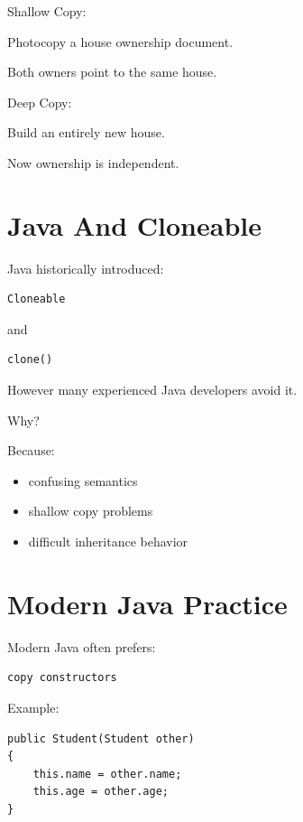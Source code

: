 \documentclass[11pt,a4paper]{book}
\begin{document}
\begin{mentalmodel}

Shallow Copy:

Photocopy a house ownership document.

Both owners point to the same house.

Deep Copy:

Build an entirely new house.

Now ownership is independent.

\end{mentalmodel}


\section{Java And Cloneable}

Java historically introduced:

\begin{verbatim}
Cloneable
\end{verbatim}

and

\begin{verbatim}
clone()
\end{verbatim}

However many experienced Java developers avoid it.

Why?

Because:

\begin{itemize}

\item confusing semantics
\item shallow copy problems
\item difficult inheritance behavior
\end{itemize}


\section{Modern Java Practice}

Modern Java often prefers:

\begin{verbatim}
copy constructors
\end{verbatim}

Example:

\begin{verbatim}
public Student(Student other)
{
    this.name = other.name;
    this.age = other.age;
}
\end{verbatim}
\end{document}
